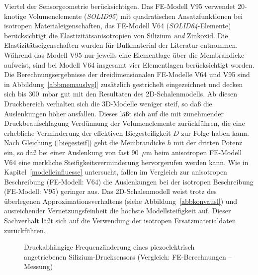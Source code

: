 Viertel der Sensorgeometrie berücksichtigen.
Das FE-Modell V95 verwendet 20-knotige
Volumenelemente ({\em SOLID95}) mit quadratischen Ansatzfunktionen bei
isotropen Materialeigenschaften, das FE-Modell V64 ({\em SOLID64}-Elemente)
berücksichtigt die Elastizitätsanisotropien von Silizium {\em und} Zinkoxid.
Die Elastizitätseigenschaften wurden
für Bulkmaterial der Literatur \cite{LB82} entnommen. Während das Modell V95
nur jeweils eine Elementlage über die Membrandicke aufweist, sind bei
Modell V64 insgesamt vier Elementlagen berücksichtigt worden.
Die Berechnungsergebnisse der dreidimensionalen FE-Modelle V64 und V95 sind
in Abbildung~\ref{abbmemauslvgl} zusätzlich gestrichelt eingezeichnet
und decken sich bis 300~mbar gut mit den Resultaten des 2D-Schalenmodells.
Ab diesen Druckbereich verhalten sich die 3D-Modelle weniger steif, so daß
die Auslenkungen höher ausfallen. Dieses läßt sich auf die mit zunehmender
Druckbeaufschlagung Verdünnung der Volumenelemente zurückführen, die eine
erhebliche Verminderung der effektiven Biegesteifigkeit $D$
zur Folge haben kann. Nach
Gleichung (\ref{biegesteif}) geht die Membrandicke $h$ mit der dritten
Potenz ein, so daß bei einer Auslenkung von fast 90~$\mu$m beim
anisotropen FE-Modell V64 eine merkliche Steifigkeitsverminderung
hervorgerufen werden kann.
Wie in Kapitel~\ref{modelleinfluesse} untersucht, fallen im Vergleich zur
anisotropen Beschreibung (FE-Modell: V64) die Auslenkungen bei der
isotropen Beschreibung (FE-Modell: V95) geringer aus. Das 2D-Schalenmodell
weist trotz des überlegenen Approximationsverhaltens (siehe
Abbildung~\ref{abbkonvausl}) und ausreichender Vernetzungsfeinheit
die höchste Modellsteifigkeit auf. Dieser Sachverhalt läßt sich auf die
Verwendung der isotropen Ersatzmaterialdaten zurückführen.\\
\begin{figure}[htb]
 \begin{center}

\setabbvn
\end{center}
\caption{\label{abbmemfreqvgl}
 Druckabhängige Frequenzänderung eines piezoelektrisch angetriebenen
 Silizium-Drucksensors (Vergleich: FE-Berechnungen -- Messung)}
\end{figure}
